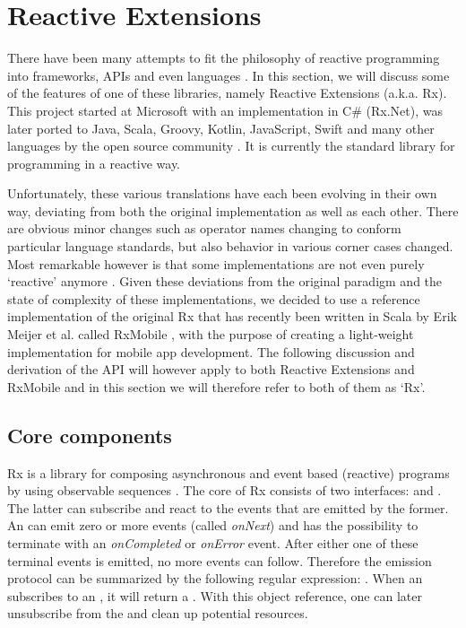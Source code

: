 \section{Reactive Extensions}
There have been many attempts to fit the philosophy of reactive programming into frameworks, APIs and even languages \cite{ReactiveX, meijer2015-Dart, Reactive-Streams, Akka, Elm, RxMobile}. In this section, we will discuss some of the features of one of these libraries, namely Reactive Extensions (a.k.a. Rx). This project started at Microsoft with an implementation in C\# \cite{meijer2010-Observable} (Rx.Net), was later ported to Java, Scala, Groovy, Kotlin, JavaScript, Swift and many other languages by the open source community \cite{ReactiveX}. It is currently the standard library for programming in a reactive way.

Unfortunately, these various translations have each been evolving in their own way, deviating from both the original implementation as well as each other. There are obvious minor changes such as operator names changing to conform particular language standards, but also behavior in various corner cases changed. Most remarkable however is that some implementations are not even purely `reactive' anymore \cite{meijer2014-Derivation}. Given these deviations from the original paradigm and the state of complexity of these implementations, we decided to use a reference implementation of the original Rx that has recently been written in Scala by Erik Meijer et al. called RxMobile \cite{RxMobile}, with the purpose of creating a light-weight implementation for mobile app development. The following discussion and derivation of the API will however apply to both Reactive Extensions and RxMobile and in this section we will therefore refer to both of them as `Rx'.

\subsection{Core components}
\label{subsec:core-comps}
Rx is a library for composing asynchronous and event based (reactive) programs by using observable sequences \cite{Rx-Codeplex}. The core of Rx consists of two interfaces: \obs and \obv. The latter can subscribe and react to the events that are emitted by the former. An \obs can emit zero or more events (called \textit{onNext}) and has the possibility to terminate with an \textit{onCompleted} or \textit{onError} event. After either one of these terminal events is emitted, no more events can follow. Therefore the emission protocol can be summarized by the following regular expression:  \cite{MS2010-RxDesign}. When an \obv subscribes to an \obs, it will return a \subs. With this object reference, one can later unsubscribe from the \obs and clean up potential resources.

